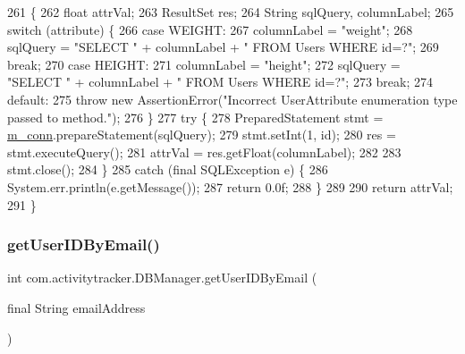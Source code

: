 \begin{DoxyCode}
261                                                                                     \{
262         \textcolor{keywordtype}{float} attrVal;
263         ResultSet res;
264         String sqlQuery, columnLabel;
265         \textcolor{keywordflow}{switch} (attribute) \{
266             \textcolor{keywordflow}{case} WEIGHT:
267                 columnLabel = \textcolor{stringliteral}{"weight"};
268                 sqlQuery = \textcolor{stringliteral}{"SELECT "} + columnLabel + \textcolor{stringliteral}{" FROM Users WHERE id=?"};
269                 \textcolor{keywordflow}{break};
270             \textcolor{keywordflow}{case} HEIGHT:
271                 columnLabel = \textcolor{stringliteral}{"height"};
272                 sqlQuery = \textcolor{stringliteral}{"SELECT "} + columnLabel + \textcolor{stringliteral}{" FROM Users WHERE id=?"};
273                 \textcolor{keywordflow}{break};
274             \textcolor{keywordflow}{default}:
275                 \textcolor{keywordflow}{throw} \textcolor{keyword}{new} AssertionError(\textcolor{stringliteral}{"Incorrect UserAttribute enumeration type passed to method."});
276         \}
277         \textcolor{keywordflow}{try} \{
278             PreparedStatement stmt = \mbox{\hyperlink{classcom_1_1activitytracker_1_1_d_b_manager_a064088d13ac09eb147fdc19268771521}{m\_conn}}.prepareStatement(sqlQuery);
279             stmt.setInt(1, \textcolor{keywordtype}{id});
280             res = stmt.executeQuery();
281             attrVal = res.getFloat(columnLabel);
282 
283             stmt.close();
284         \}
285         \textcolor{keywordflow}{catch} (\textcolor{keyword}{final} SQLException e) \{
286             System.err.println(e.getMessage());
287             \textcolor{keywordflow}{return} 0.0f;
288         \}
289 
290         \textcolor{keywordflow}{return} attrVal;
291     \}
\end{DoxyCode}
\mbox{\label{classcom_1_1activitytracker_1_1_d_b_manager_a195dcdeabdd00facb19d720976dd3f53}} 
\subsubsection{\texorpdfstring{get\+User\+I\+D\+By\+Email()}{getUserIDByEmail()}}
{\footnotesize\ttfamily int com.\+activitytracker.\+D\+B\+Manager.\+get\+User\+I\+D\+By\+Email (\begin{DoxyParamCaption}\item[{final String}]{email\+Address }\end{DoxyParamCaption})}

